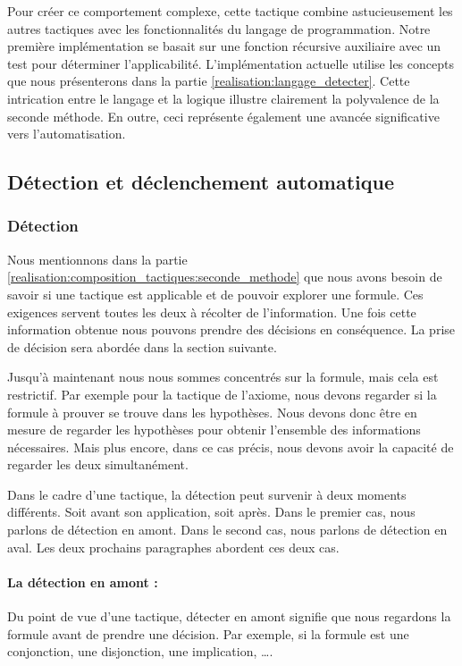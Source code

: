 \documentclass[french,titlepage]{article}
\begin{document}
Pour créer ce comportement complexe, cette tactique combine astucieusement les autres tactiques avec les fonctionnalités du langage de programmation. Notre première implémentation se basait sur une fonction récursive auxiliaire avec un test pour déterminer l'applicabilité. L'implémentation actuelle utilise les concepts que nous présenterons dans la partie \ref{realisation:langage_detecter}. Cette intrication entre le langage et la logique illustre clairement la polyvalence de la seconde méthode. En outre, ceci représente également une avancée significative vers l'automatisation.

\subsection{Détection et déclenchement automatique} \label{realisation:detection_declenchement}
\subsubsection{Détection} \label{realisation:detection_declenchement:detection}
Nous mentionnons dans la partie \ref{realisation:composition_tactiques:seconde_methode} que nous avons besoin de savoir si une tactique est applicable et de pouvoir explorer une formule. Ces exigences servent toutes les deux à récolter de l'information. Une fois cette information obtenue nous pouvons prendre des décisions en conséquence. La prise de décision sera abordée dans la section suivante.

Jusqu'à maintenant nous nous sommes concentrés sur la formule, mais cela est restrictif. Par exemple pour la tactique de l'axiome, nous devons regarder si la formule à prouver se trouve dans les hypothèses. Nous devons donc être en mesure de regarder les hypothèses pour obtenir l'ensemble des informations nécessaires. Mais plus encore, dans ce cas précis, nous devons avoir la capacité de regarder les deux simultanément.

Dans le cadre d'une tactique, la détection peut survenir à deux moments différents. Soit avant son application, soit après. Dans le premier cas, nous parlons de détection en amont. Dans le second cas, nous parlons de détection en aval. Les deux prochains paragraphes abordent ces deux cas.

\paragraph{La détection en amont :} \label{realisation:detection_declenchement:detection:amont}
Du point de vue d'une tactique, détecter en amont signifie que nous regardons la formule avant de prendre une décision. Par exemple, si la formule est une conjonction, une disjonction, une implication, \dots.
\end{document}
